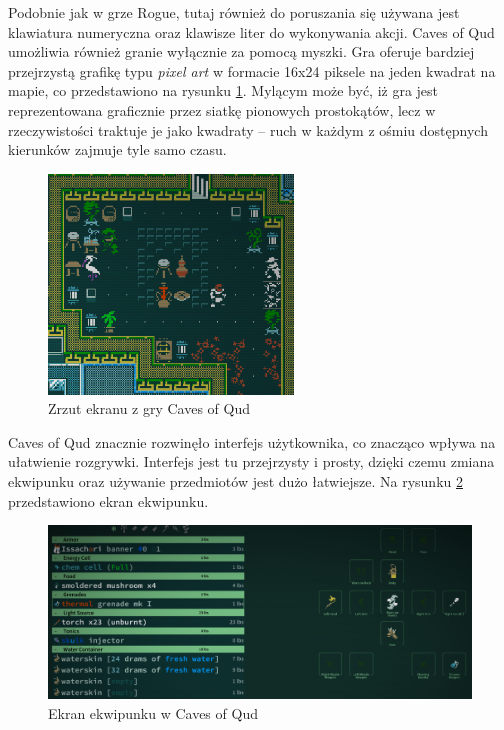 \documentclass[12pt,twoside]{article}
\begin{document}
Podobnie jak w grze Rogue, tutaj również do poruszania się używana jest klawiatura numeryczna oraz klawisze liter do wykonywania akcji. Caves of Qud umożliwia również granie wyłącznie za pomocą myszki. Gra oferuje bardziej przejrzystą grafikę typu \emph{pixel art} w formacie 16x24 piksele na jeden kwadrat na mapie, co przedstawiono na rysunku \ref{CoQ:scr3}. Mylącym może być, iż gra jest reprezentowana graficznie przez siatkę pionowych prostokątów, lecz w rzeczywistości traktuje je jako kwadraty -- ruch w każdym z ośmiu dostępnych kierunków zajmuje tyle samo czasu.

\FloatBarrier
\begin{figure}[ht]
	\centering
	\includegraphics[width=65mm]{images/caves_of_qud/scr3.png}
	\caption{Zrzut ekranu z gry Caves of Qud}
	\label{CoQ:scr3}
\end{figure}
\FloatBarrier

Caves of Qud znacznie rozwinęło interfejs użytkownika, co znacząco wpływa na ułatwienie rozgrywki. Interfejs jest tu przejrzysty i prosty, dzięki czemu zmiana ekwipunku oraz używanie przedmiotów jest dużo łatwiejsze. Na rysunku \ref{CoQ:scr2} przedstawiono ekran ekwipunku.

\FloatBarrier
\begin{figure}[ht]
	\centering
	\includegraphics[width=14cm]{images/caves_of_qud/scr2.png}
	\caption{Ekran ekwipunku w Caves of Qud}
	\label{CoQ:scr2}
\end{figure}
\FloatBarrier
\end{document}
